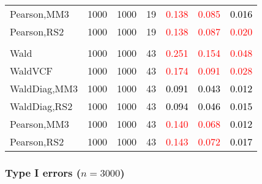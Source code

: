 \documentclass[
]{article}
\begin{document}
\begin{table}[H]
{\begin{tabular}[t]{lrrrrrr}
\hspace{1em}Pearson,MM3 & 1000 & 1000 & 19 & \textcolor{red}{0.138} & \textcolor{red}{0.085} & \textcolor{black}{0.016}\\
\hspace{1em}Pearson,RS2 & 1000 & 1000 & 19 & \textcolor{red}{0.138} & \textcolor{red}{0.087} & \textcolor{red}{0.020}\\
\addlinespace[0.3em]
\multicolumn{7}{l}{\textbf{3F 15V}}\\
\hspace{1em}Wald & 1000 & 1000 & 43 & \textcolor{red}{0.251} & \textcolor{red}{0.154} & \textcolor{red}{0.048}\\
\hspace{1em}WaldVCF & 1000 & 1000 & 43 & \textcolor{red}{0.174} & \textcolor{red}{0.091} & \textcolor{red}{0.028}\\
\hspace{1em}WaldDiag,MM3 & 1000 & 1000 & 43 & \textcolor{black}{0.091} & \textcolor{black}{0.043} & \textcolor{black}{0.012}\\
\hspace{1em}WaldDiag,RS2 & 1000 & 1000 & 43 & \textcolor{black}{0.094} & \textcolor{black}{0.046} & \textcolor{black}{0.015}\\
\hspace{1em}Pearson,MM3 & 1000 & 1000 & 43 & \textcolor{red}{0.140} & \textcolor{red}{0.068} & \textcolor{black}{0.012}\\
\hspace{1em}Pearson,RS2 & 1000 & 1000 & 43 & \textcolor{red}{0.143} & \textcolor{red}{0.072} & \textcolor{black}{0.017}\\
\bottomrule
\end{tabular}}
\endgroup{}
\end{table}

\hypertarget{type-i-errors-n3000-3}{%
\subsubsection{\texorpdfstring{Type I errors
(\(n=3000\))}{Type I errors (n=3000)}}\label{type-i-errors-n3000-3}}
\end{document}
